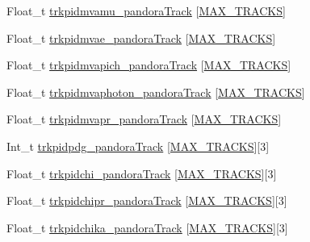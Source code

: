 \begin{DoxyCompactItemize}
\item 
Float\-\_\-t \hyperlink{classanatree_a162fe363578d752417ce4df642ca58ba}{trkpidmvamu\-\_\-pandora\-Track} \mbox{[}\hyperlink{anatree__core__v09410002__orig_8h_a327fd4e796e4a0d78947524c96e4362e}{M\-A\-X\-\_\-\-T\-R\-A\-C\-K\-S}\mbox{]}
\item 
Float\-\_\-t \hyperlink{classanatree_a3ec8db7dd8d43370ee8cbf7c07653968}{trkpidmvae\-\_\-pandora\-Track} \mbox{[}\hyperlink{anatree__core__v09410002__orig_8h_a327fd4e796e4a0d78947524c96e4362e}{M\-A\-X\-\_\-\-T\-R\-A\-C\-K\-S}\mbox{]}
\item 
Float\-\_\-t \hyperlink{classanatree_a19da3d95303f59672c123ed72a8bd0e3}{trkpidmvapich\-\_\-pandora\-Track} \mbox{[}\hyperlink{anatree__core__v09410002__orig_8h_a327fd4e796e4a0d78947524c96e4362e}{M\-A\-X\-\_\-\-T\-R\-A\-C\-K\-S}\mbox{]}
\item 
Float\-\_\-t \hyperlink{classanatree_a4b3f933f34841a84d5a611959596c0b8}{trkpidmvaphoton\-\_\-pandora\-Track} \mbox{[}\hyperlink{anatree__core__v09410002__orig_8h_a327fd4e796e4a0d78947524c96e4362e}{M\-A\-X\-\_\-\-T\-R\-A\-C\-K\-S}\mbox{]}
\item 
Float\-\_\-t \hyperlink{classanatree_a5463178fd5350de3307da3766ca050ff}{trkpidmvapr\-\_\-pandora\-Track} \mbox{[}\hyperlink{anatree__core__v09410002__orig_8h_a327fd4e796e4a0d78947524c96e4362e}{M\-A\-X\-\_\-\-T\-R\-A\-C\-K\-S}\mbox{]}
\item 
Int\-\_\-t \hyperlink{classanatree_a00011e8576a8d5ed7b91a831c7e08f29}{trkpidpdg\-\_\-pandora\-Track} \mbox{[}\hyperlink{anatree__core__v09410002__orig_8h_a327fd4e796e4a0d78947524c96e4362e}{M\-A\-X\-\_\-\-T\-R\-A\-C\-K\-S}\mbox{]}\mbox{[}3\mbox{]}
\item 
Float\-\_\-t \hyperlink{classanatree_afa8d6d92e18f547d1481c2c5bf354e64}{trkpidchi\-\_\-pandora\-Track} \mbox{[}\hyperlink{anatree__core__v09410002__orig_8h_a327fd4e796e4a0d78947524c96e4362e}{M\-A\-X\-\_\-\-T\-R\-A\-C\-K\-S}\mbox{]}\mbox{[}3\mbox{]}
\item 
Float\-\_\-t \hyperlink{classanatree_a627730b2ca665fba61264ea802ff8191}{trkpidchipr\-\_\-pandora\-Track} \mbox{[}\hyperlink{anatree__core__v09410002__orig_8h_a327fd4e796e4a0d78947524c96e4362e}{M\-A\-X\-\_\-\-T\-R\-A\-C\-K\-S}\mbox{]}\mbox{[}3\mbox{]}
\item 
Float\-\_\-t \hyperlink{classanatree_aee3b98d0f388fbdd52ddc520b2dbdffd}{trkpidchika\-\_\-pandora\-Track} \mbox{[}\hyperlink{anatree__core__v09410002__orig_8h_a327fd4e796e4a0d78947524c96e4362e}{M\-A\-X\-\_\-\-T\-R\-A\-C\-K\-S}\mbox{]}\mbox{[}3\mbox{]}
\item 

\end{DoxyCompactItemize}
